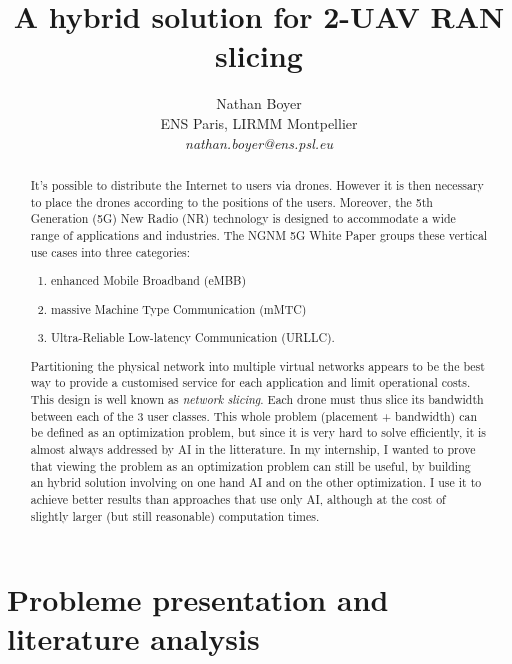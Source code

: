 \documentclass[letterpaper]{article}
\title{A hybrid solution for 2-UAV RAN slicing}
\author{Nathan Boyer \\ ENS Paris, LIRMM Montpellier \\ \textit{nathan.boyer@ens.psl.eu}}
\begin{document}
\maketitle

\begin{abstract}

    It's possible to distribute the Internet to users via drones.
    However it is then necessary to place the drones according to the positions of the users.
    Moreover, the 5th Generation (5G) New Radio (NR) technology is designed to accommodate a wide range of applications and industries. The NGNM 5G White Paper \cite{5gwhitepaper} groups these vertical use cases into three categories:
    \begin{enumerate}
        \item enhanced Mobile Broadband (eMBB)
        \item massive Machine Type Communication (mMTC)
        \item Ultra-Reliable Low-latency Communication (URLLC).
    \end{enumerate}

    Partitioning the physical network into multiple virtual networks appears to be the best way to provide a customised service for each application and limit operational costs. This design is well known as \textit{network slicing}.
    Each drone must thus slice its bandwidth between each of the 3 user classes.
    This whole problem (placement + bandwidth) can be defined as an optimization problem, but since it is very hard to solve efficiently, it is almost always addressed by AI in the litterature.
    In my internship, I wanted to prove that viewing the problem as an optimization problem can still be useful, by building an hybrid solution involving on one hand AI and on the other optimization.
    I use it to achieve better results than approaches that use only AI, although at the cost of slightly larger (but still reasonable) computation times.
\end{abstract}


\tableofcontents


\section{Probleme presentation and literature analysis}
\end{document}

